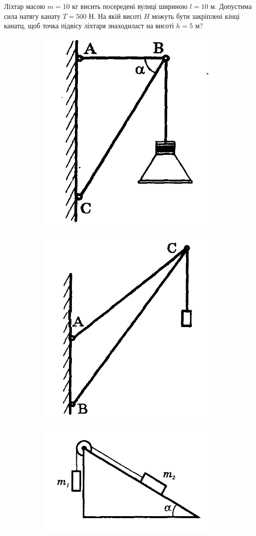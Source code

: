 \justifying
\begin{problem}{1}
	Ліхтар масою $m = 10$ кг висить посередені вулиці шириною $l = 10$ м. Допустима сила натягу канату $T = 500$ Н. На якій висоті $H$ можуть бути закріплені кінці канатц, щоб точка підвісу ліхтаря знаходиласт на висоті $h = 5$  м?
	
	\begin{figure}[h!]
		\begin{subfigure}{.4\textwidth}
			\centering
			\includegraphics[width=0.5\linewidth]{class8/gelf_58}
			\caption{}
			\label{fig:gelf58}
		\end{subfigure}
		\begin{subfigure}{.4\textwidth}
			\centering
			\includegraphics[width=0.5\linewidth]{class8/gelf_59}
			\caption{}
			\label{fig:gelf59}
		\end{subfigure}
		\begin{subfigure}{.4\textwidth}
			\centering
			\includegraphics[width=0.5\linewidth]{class8/gelf_512}
			\caption{}
			\label{fig:gelf512}
		\end{subfigure}
	\end{figure}
\end{problem}



